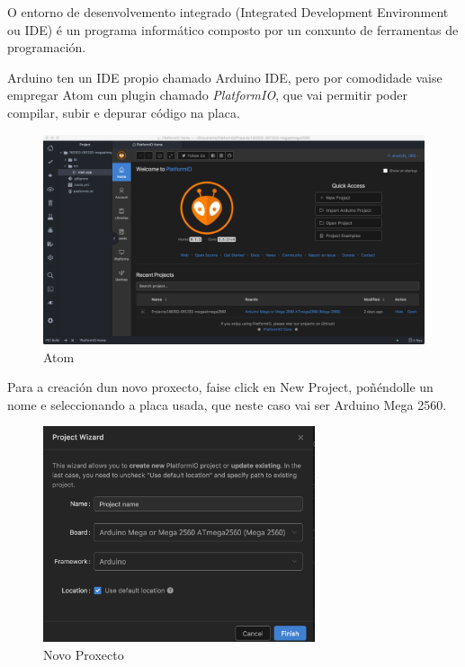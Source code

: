 \documentclass[11pt,twoside]{book}
\begin{document}
O entorno de desenvolvemento integrado (Integrated Development Environment ou IDE) é un programa informático composto por un conxunto de ferramentas de programación. 

Arduino ten un IDE propio chamado Arduino IDE, pero por comodidade vaise empregar Atom cun plugin chamado \textit{PlatformIO}, que vai permitir poder compilar, subir e depurar código na placa.

\begin{figure}[H]
	\begin{center}
		\includegraphics[width=15cm]{images/Atom.png}
	\end{center}
	\caption{Atom}
	\label{fig:Atom}
\end{figure}

Para a creación dun novo proxecto, faise click en New Project, poñéndolle un nome e seleccionando a placa usada, que neste caso vai ser Arduino Mega 2560.

\begin{figure}[H]
	\begin{center}
		\includegraphics[width=8cm]{images/NewProject.png}
	\end{center}
	\caption{Novo Proxecto}
	\label{fig:NewProject}
\end{figure}
\end{document}
